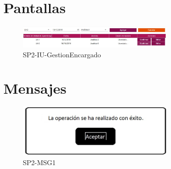 \chapter{Pantallas}
 \begin{figure}
  \centering
    \includegraphics[width=0.7\textwidth]{DCU/SP2/Pantallas/GestionEncargado}
  \caption{SP2-IU-GestionEncargado}
  \label{SP2-IU-GestionEncargado}
\end{figure}

\chapter{Mensajes}
 \begin{figure}
  \centering
    \includegraphics[width=0.7\textwidth]{DCU/SP2/mensajes/MSG1}
   \caption{SP2-MSG1}
  \label{SP2-MSG1}
\end{figure}


